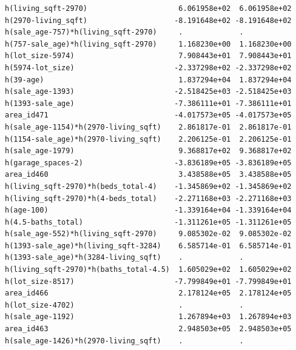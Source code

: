 \documentclass[
]{article}
\begin{document}
\begin{verbatim}
h(living_sqft-2970)                     6.061958e+02  6.061958e+02
h(2970-living_sqft)                    -8.191648e+02 -8.191648e+02
h(sale_age-757)*h(living_sqft-2970)     .             .           
h(757-sale_age)*h(living_sqft-2970)     1.168230e+00  1.168230e+00
h(lot_size-5974)                        7.908443e+01  7.908443e+01
h(5974-lot_size)                       -2.337298e+02 -2.337298e+02
h(39-age)                               1.837294e+04  1.837294e+04
h(sale_age-1393)                       -2.518425e+03 -2.518425e+03
h(1393-sale_age)                       -7.386111e+01 -7.386111e+01
area_id471                             -4.017573e+05 -4.017573e+05
h(sale_age-1154)*h(2970-living_sqft)    2.861817e-01  2.861817e-01
h(1154-sale_age)*h(2970-living_sqft)    2.206125e-01  2.206125e-01
h(sale_age-1979)                        9.368817e+02  9.368817e+02
h(garage_spaces-2)                     -3.836189e+05 -3.836189e+05
area_id460                              3.438588e+05  3.438588e+05
h(living_sqft-2970)*h(beds_total-4)    -1.345869e+02 -1.345869e+02
h(living_sqft-2970)*h(4-beds_total)    -2.271168e+03 -2.271168e+03
h(age-100)                             -1.339164e+04 -1.339164e+04
h(4.5-baths_total)                     -1.311261e+05 -1.311261e+05
h(sale_age-552)*h(living_sqft-2970)     9.085302e-02  9.085302e-02
h(1393-sale_age)*h(living_sqft-3284)    6.585714e-01  6.585714e-01
h(1393-sale_age)*h(3284-living_sqft)    .             .           
h(living_sqft-2970)*h(baths_total-4.5)  1.605029e+02  1.605029e+02
h(lot_size-8517)                       -7.799849e+01 -7.799849e+01
area_id466                              2.178124e+05  2.178124e+05
h(lot_size-4702)                        .             .           
h(sale_age-1192)                        1.267894e+03  1.267894e+03
area_id463                              2.948503e+05  2.948503e+05
h(sale_age-1426)*h(2970-living_sqft)    .             .           
                                                                  

\end{verbatim}
\end{document}
